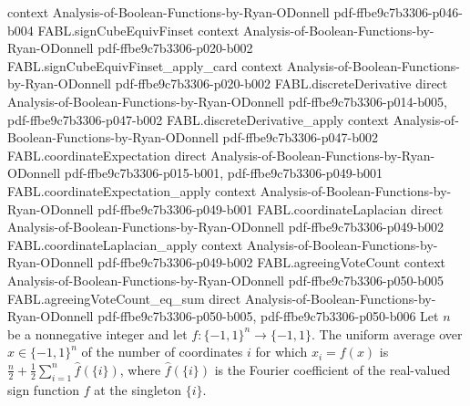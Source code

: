 \begin{theorem}
  {context}
  {Analysis-of-Boolean-Functions-by-Ryan-ODonnell}
  {pdf-ffbe9c7b3306-p046-b004}
\proofstep
  {FABL.signCubeEquivFinset}
  {context}
  {Analysis-of-Boolean-Functions-by-Ryan-ODonnell}
  {pdf-ffbe9c7b3306-p020-b002}
\proofstep
  {FABL.signCubeEquivFinset_apply_card}
  {context}
  {Analysis-of-Boolean-Functions-by-Ryan-ODonnell}
  {pdf-ffbe9c7b3306-p020-b002}
\proofstep
  {FABL.discreteDerivative}
  {direct}
  {Analysis-of-Boolean-Functions-by-Ryan-ODonnell}
  {pdf-ffbe9c7b3306-p014-b005,
    pdf-ffbe9c7b3306-p047-b002}
\proofstep
  {FABL.discreteDerivative_apply}
  {context}
  {Analysis-of-Boolean-Functions-by-Ryan-ODonnell}
  {pdf-ffbe9c7b3306-p047-b002}
\proofstep
  {FABL.coordinateExpectation}
  {direct}
  {Analysis-of-Boolean-Functions-by-Ryan-ODonnell}
  {pdf-ffbe9c7b3306-p015-b001,
    pdf-ffbe9c7b3306-p049-b001}
\proofstep
  {FABL.coordinateExpectation_apply}
  {context}
  {Analysis-of-Boolean-Functions-by-Ryan-ODonnell}
  {pdf-ffbe9c7b3306-p049-b001}
\proofstep
  {FABL.coordinateLaplacian}
  {direct}
  {Analysis-of-Boolean-Functions-by-Ryan-ODonnell}
  {pdf-ffbe9c7b3306-p049-b002}
\proofstep
  {FABL.coordinateLaplacian_apply}
  {context}
  {Analysis-of-Boolean-Functions-by-Ryan-ODonnell}
  {pdf-ffbe9c7b3306-p049-b002}
\proofstep
  {FABL.agreeingVoteCount}
  {context}
  {Analysis-of-Boolean-Functions-by-Ryan-ODonnell}
  {pdf-ffbe9c7b3306-p050-b005}
\proofstep
  {FABL.agreeingVoteCount_eq_sum}
  {direct}
  {Analysis-of-Boolean-Functions-by-Ryan-ODonnell}
  {pdf-ffbe9c7b3306-p050-b005,
    pdf-ffbe9c7b3306-p050-b006}
Let $n$ be a nonnegative integer and let $f:\{-1,1\}^n\to\{-1,1\}$. The uniform average
over $x\in\{-1,1\}^n$ of the number of coordinates $i$ for which $x_i=f(x)$ is $\frac
n2+\frac12\sum_{i=1}^n\widehat f(\{i\})$, where $\widehat f(\{i\})$ is the Fourier
coefficient of the real-valued sign function $f$ at the singleton $\{i\}$.
\end{theorem}

